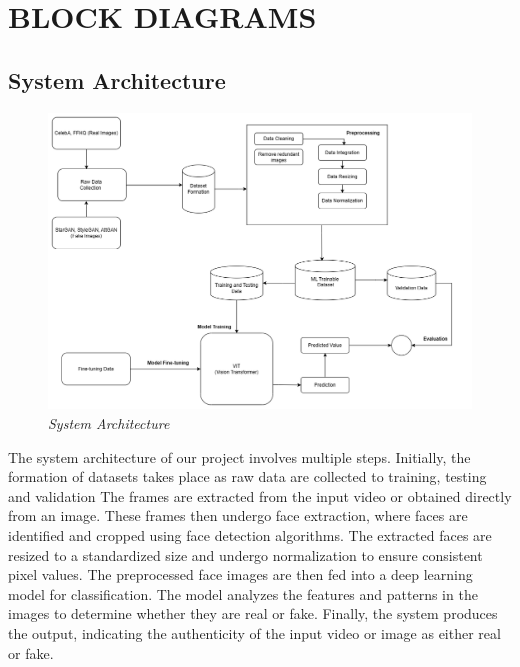 \section{BLOCK DIAGRAMS}
\subsection{System Architecture}
\begin{figure}[h]
    \centering
    \includegraphics[width= 6.5in ]{img/Model_Architecture.drawio (3).png}
    \caption{\textit{System Architecture}}

\end{figure}
\justify
The system architecture of our project involves multiple steps. Initially, the formation of datasets takes place as raw data are collected to training, testing and validation  The frames are extracted from the input video or obtained directly from an image. These frames then undergo face extraction, where faces are identified and cropped using face detection algorithms. The extracted faces are resized to a standardized size and undergo normalization to ensure consistent pixel values. The preprocessed face images are then fed into a deep learning model for classification. The model analyzes the features and patterns in the images to determine whether they are real or fake. Finally, the system produces the output, indicating the authenticity of the input video or image as either real or fake.
